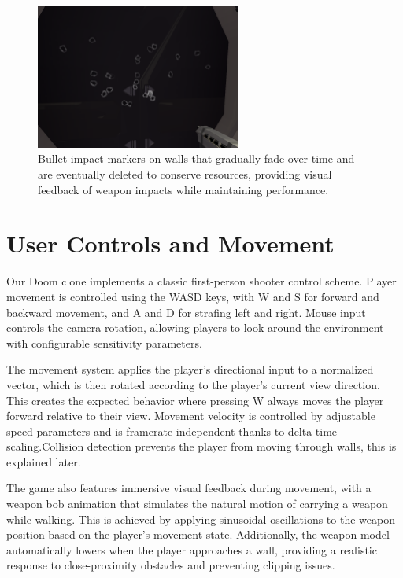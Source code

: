\documentclass{article}
\begin{document}
\begin{figure}[H]
    \centering
    \includegraphics[width=0.6\textwidth]{diagrams/bullets.png}
    \caption{Bullet impact markers on walls that gradually fade over time and are eventually deleted to conserve resources, providing visual feedback of weapon impacts while maintaining performance.}
    \label{fig:bullet-markers}
\end{figure}


\section{User Controls and Movement}
Our Doom clone implements a classic first-person shooter control scheme. Player movement is controlled using the WASD keys, with W and S for forward and backward movement, and A and D for strafing left and right. Mouse input controls the camera rotation, allowing players to look around the environment with configurable sensitivity parameters.

The movement system applies the player's directional input to a normalized vector, which is then rotated according to the player's current view direction. This creates the expected behavior where pressing W always moves the player forward relative to their view. Movement velocity is controlled by adjustable speed parameters and is framerate-independent thanks to delta time scaling.Collision detection prevents the player from moving through walls, this is explained later.

The game also features immersive visual feedback during movement, with a weapon bob animation that simulates the natural motion of carrying a weapon while walking. This is achieved by applying sinusoidal oscillations to the weapon position based on the player's movement state. Additionally, the weapon model automatically lowers when the player approaches a wall, providing a realistic response to close-proximity obstacles and preventing clipping issues.
\end{document}
